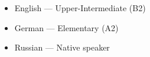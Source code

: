 \begin{itemize}
\item English — Upper-Intermediate (B2)
\item German — Elementary (A2)
\item Russian — Native speaker
\end{itemize}
